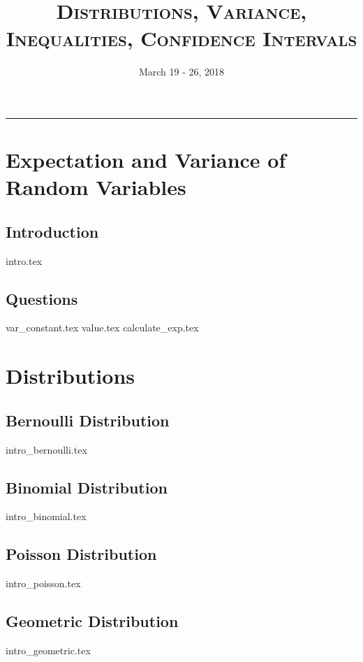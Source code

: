 \documentclass{exam}
\title{\textsc{Distributions, Variance, Inequalities, Confidence Intervals}}
\date{March 19 - 26, 2018}
\begin{document}
\maketitle
\rule{\textwidth}{0.15em}
\fontsize{12}{15}\selectfont
\thispagestyle{empty}


\section{Expectation and Variance of Random Variables}
\subsection{Introduction}
{intro.tex}
\subsection{Questions}
\begin{questions}
{var_constant.tex}
{value.tex}
{calculate_exp.tex}
\end{questions}

\section{Distributions}
\subsection{Bernoulli Distribution}
{intro_bernoulli.tex}
\subsection{Binomial Distribution}
{intro_binomial.tex}
\subsection{Poisson Distribution}
{intro_poisson.tex}
\subsection{Geometric Distribution}
{intro_geometric.tex}
\end{document}
